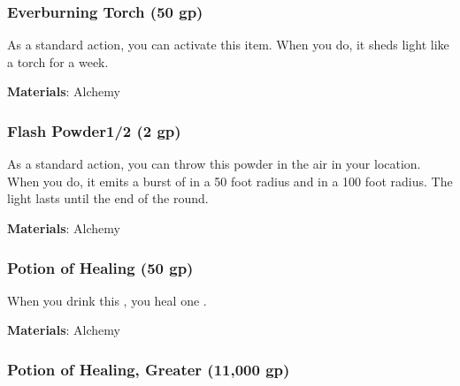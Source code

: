 \lowercase{\hypertarget{item:Everburning Torch}{}}\label{item:Everburning Torch}
\hypertarget{item:Everburning Torch}{\subsubsection{Everburning Torch\hfill{} (50 gp)}}

As a standard action, you can activate this item.
When you do, it sheds light like a torch for a week.



\vspace{0.25em}
\textbf{Materials}: Alchemy


\lowercase{\hypertarget{item:Flash Powder}{}}\label{item:Flash Powder}
\hypertarget{item:Flash Powder}{\subsubsection{Flash Powder\hfill1/2 (2 gp)}}

As a standard action, you can throw this powder in the air in your location.
When you do, it emits a burst of  in a 50 foot radius and  in a 100 foot radius.
The light lasts until the end of the round.



\vspace{0.25em}
\textbf{Materials}: Alchemy


\lowercase{\hypertarget{item:Potion of Healing}{}}\label{item:Potion of Healing}
\hypertarget{item:Potion of Healing}{\subsubsection{Potion of Healing\hfill{} (50 gp)}}

When you drink this , you heal one .



\vspace{0.25em}
\textbf{Materials}: Alchemy


\lowercase{\hypertarget{item:Potion of Healing, Greater}{}}\label{item:Potion of Healing, Greater}
\hypertarget{item:Potion of Healing, Greater}{\subsubsection{Potion of Healing, Greater\hfill{} (11,000  gp)}}

